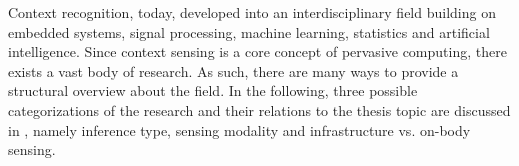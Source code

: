 Context recognition, today, developed into an interdisciplinary field
building on embedded systems, signal processing, machine learning,
statistics and artificial intelligence. Since context sensing is a core concept of pervasive computing, 
there exists a vast body of research. As such, there are many ways to provide a structural overview about the field.
In the following, three possible categorizations of the research and their relations to the thesis topic are discussed in , 
namely inference type, sensing modality and infrastructure vs. on-body sensing.

 

